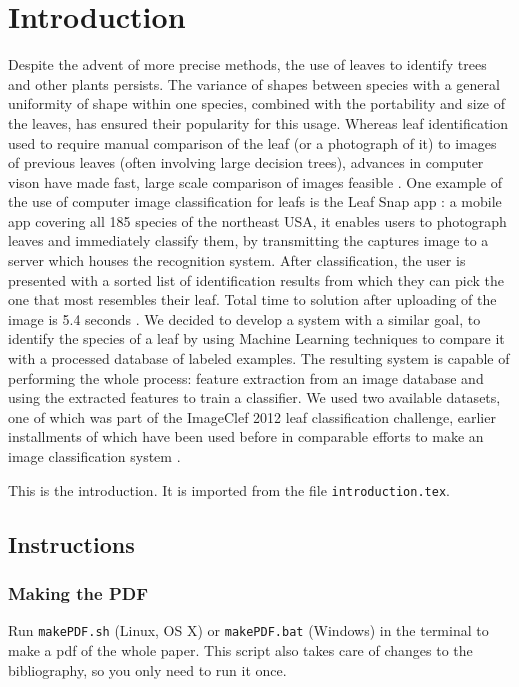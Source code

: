 \section{Introduction}
Despite the advent of more precise methods, the use of leaves to identify trees and other plants persists. The variance of shapes between species with a general uniformity of shape within one species, combined with the portability and size of the leaves, has ensured their popularity for this usage. 
Whereas leaf identification used to require manual comparison of the leaf (or a photograph of it) to images of previous leaves (often involving large decision trees), advances in computer vison have made fast, large scale comparison of images feasible \cite{Belh2008}. One example of the use of computer image classification for leafs is the Leaf Snap app \cite{Kuma2012}: a mobile app covering all 185 species of the northeast USA, it enables users to photograph leaves and immediately classify them, by transmitting the captures image to a server which houses the recognition system. After classification, the user is presented with a sorted list of identification results from which they can pick the one that most resembles their leaf. Total time to solution after uploading of the image is 5.4 seconds \cite{Kuma2012}.
We decided to develop a system with a similar goal, to identify the species of a leaf by using Machine Learning techniques to compare it with a processed database of labeled examples. The resulting system is capable of performing the whole process: feature extraction from an image database and using the extracted features to train a classifier. We used two available datasets, one of which was part of the ImageClef 2012 leaf classification challenge, earlier installments of which have been used before in comparable efforts to make an image classification system \cite{Goea2011}.

This is the introduction.
It is imported from the file \verb+introduction.tex+.

\subsection{Instructions}
\subsubsection{Making the PDF}
Run \verb+makePDF.sh+ (Linux, OS X) or \verb+makePDF.bat+ (Windows) in the terminal to make a pdf of the whole paper.
This script also takes care of changes to the bibliography, so you only need to run it once.

